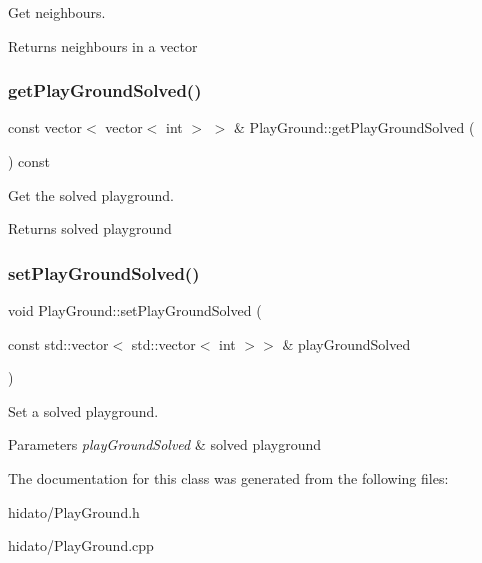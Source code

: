 Get neighbours. \begin{DoxyReturn}{Returns}
neighbours in a vector 
\end{DoxyReturn}
\mbox{\label{class_play_ground_a55585e6f5f0e35ce813a8b3443c46a1d}} 
\subsubsection{\texorpdfstring{get\+Play\+Ground\+Solved()}{getPlayGroundSolved()}}
{\footnotesize\ttfamily const vector$<$ vector$<$ int $>$ $>$ \& Play\+Ground\+::get\+Play\+Ground\+Solved (\begin{DoxyParamCaption}{ }\end{DoxyParamCaption}) const}

Get the solved playground. \begin{DoxyReturn}{Returns}
solved playground 
\end{DoxyReturn}
\mbox{\label{class_play_ground_a76a962fedfcfdfc5dd7764712d8bd058}} 
\subsubsection{\texorpdfstring{set\+Play\+Ground\+Solved()}{setPlayGroundSolved()}}
{\footnotesize\ttfamily void Play\+Ground\+::set\+Play\+Ground\+Solved (\begin{DoxyParamCaption}\item[{const std\+::vector$<$ std\+::vector$<$ int $>$$>$ \&}]{play\+Ground\+Solved }\end{DoxyParamCaption})}

Set a solved playground. 
\begin{DoxyParams}{Parameters}
{\em play\+Ground\+Solved} & solved playground \\
\hline
\end{DoxyParams}


The documentation for this class was generated from the following files\+:\begin{DoxyCompactItemize}
\item 
hidato/Play\+Ground.\+h\item 
hidato/Play\+Ground.\+cpp\end{DoxyCompactItemize}
